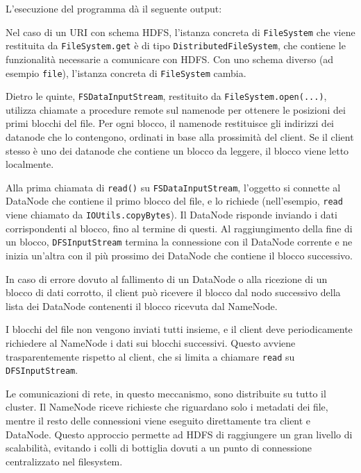 \documentclass[italian,a4paper, twoside, 12pt]{report}
\newenvironment{Shaded}{}{}
\newcommand{\ExtensionTok}[1]{#1}
\newcommand{\NormalTok}[1]{#1}
\begin{document}
L'esecuzione del programma dà il seguente output:

\begin{Shaded}
\end{Shaded}

Nel caso di un URI con schema HDFS, l'istanza concreta di
\texttt{FileSystem} che viene restituita da \texttt{FileSystem.get} è di
tipo \texttt{DistributedFileSystem}, che contiene le funzionalità
necessarie a comunicare con HDFS. Con uno schema diverso (ad esempio
\texttt{file}), l'istanza concreta di \texttt{FileSystem} cambia.

Dietro le quinte, \texttt{FSDataInputStream}, restituito da
\texttt{FileSystem.open(...)}, utilizza chiamate a procedure remote sul
namenode per ottenere le posizioni dei primi blocchi del file. Per ogni
blocco, il namenode restituisce gli indirizzi dei datanode che lo
contengono, ordinati in base alla prossimità del client. Se il client
stesso è uno dei datanode che contiene un blocco da leggere, il blocco
viene letto localmente.

Alla prima chiamata di \texttt{read()} su \texttt{FSDataInputStream},
l'oggetto si connette al DataNode che contiene il primo blocco del file,
e lo richiede (nell'esempio, \texttt{read} viene chiamato da
\texttt{IOUtils.copyBytes}). Il DataNode risponde inviando i dati
corrispondenti al blocco, fino al termine di questi. Al raggiungimento
della fine di un blocco, \texttt{DFSInputStream} termina la connessione
con il DataNode corrente e ne inizia un'altra con il più prossimo dei
DataNode che contiene il blocco successivo.

In caso di errore dovuto al fallimento di un DataNode o alla ricezione
di un blocco di dati corrotto, il client può ricevere il blocco dal nodo
successivo della lista dei DataNode contenenti il blocco ricevuta dal
NameNode.

I blocchi del file non vengono inviati tutti insieme, e il client deve
periodicamente richiedere al NameNode i dati sui blocchi successivi.
Questo avviene trasparentemente rispetto al client, che si limita a
chiamare \texttt{read} su \texttt{DFSInputStream}.

Le comunicazioni di rete, in questo meccanismo, sono distribuite su
tutto il cluster. Il NameNode riceve richieste che riguardano solo i
metadati dei file, mentre il resto delle connessioni viene eseguito
direttamente tra client e DataNode. Questo approccio permette ad HDFS di
raggiungere un gran livello di scalabilità, evitando i colli di
bottiglia dovuti a un punto di connessione centralizzato nel filesystem.
\end{document}
